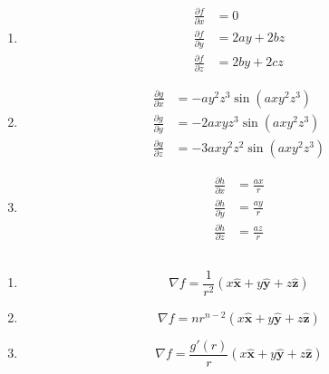 \documentclass{article}
\renewcommand{\vec}[1]{\boldsymbol{\mathbf{#1}}}
\newcommand{\uvec}[1]{\hat{\vec{#1}}}
\begin{document}
\begin{enumerate}
  \item

        \begin{align*}
          \frac{\partial f}{\partial x} & = 0             \\
          \frac{\partial f}{\partial y} & = 2 a y + 2 b z \\
          \frac{\partial f}{\partial z} & = 2 b y + 2 c z
        \end{align*}

  \item

        \begin{align*}
          \frac{\partial g}{\partial x} & = -a y^2 z^3 \sin (a x y^2 z^3)     \\
          \frac{\partial g}{\partial y} & = -2 a x y z^3 \sin (a x y^2 z^3)   \\
          \frac{\partial g}{\partial z} & = -3 a x y^2 z^2 \sin (a x y^2 z^3)
        \end{align*}

  \item

        \begin{align*}
          \frac{\partial h}{\partial x} & = \frac{a x}{r} \\
          \frac{\partial h}{\partial y} & = \frac{a y}{r} \\
          \frac{\partial h}{\partial z} & = \frac{a z}{r}
        \end{align*}
\end{enumerate}

\setcounter{subsection}{12}
\subsection{}

\begin{enumerate}
  \item \[\nabla f = \frac{1}{r^2} (x \uvec{x} + y \uvec{y} + z \uvec{z})\]

  \item \[\nabla f = n r^{n - 2} (x \uvec{x} + y \uvec{y} + z \uvec{z})\]

  \item \[\nabla f = \frac{g'(r)}{r} (x \uvec{x} + y \uvec{y} + z \uvec{z})\]
\end{enumerate}

\setcounter{subsection}{14}
\subsection{}
\end{document}
